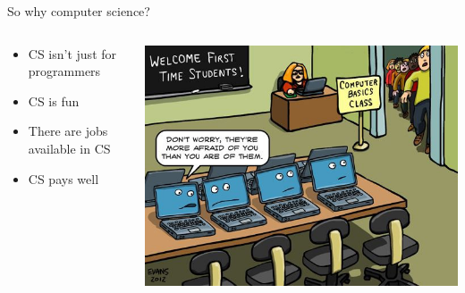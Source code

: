 \documentclass[aspectratio=169]{beamer}
\begin{document}
\begin{frame}{So why computer science?}
    \begin{columns}
        \begin{column}{0.5\textwidth}
            \begin{itemize}[label=--]
                \item CS isn't just for programmers
                \item CS is fun
                \item There are jobs available in CS
                \item CS pays well
            \end{itemize}
        \end{column}
        \begin{column}{0.5\textwidth}
            \centering
            \includegraphics[width=\linewidth]{more_afraid_comic.jpg}
        \end{column}
    \end{columns}
\end{frame}
\end{document}
